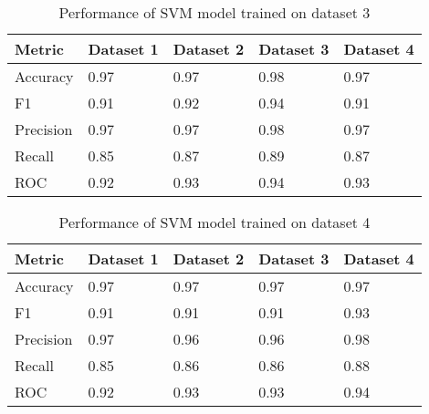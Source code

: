 \begin{table}[Ht!]
    \caption{Performance of SVM model trained on dataset 3}\label{tab:performance_of_svm_model_trained_on_dataset_3}
    \begin{tabular*}{\tblwidth}{@{}LLLLL@{}}
        \toprule
        Metric & Dataset 1 & Dataset 2 & Dataset 3 & Dataset 4 \\
        \midrule
        Accuracy & 0.97 & 0.97 & 0.98 & 0.97 \\
        F1 & 0.91 & 0.92 & 0.94 & 0.91 \\
        Precision & 0.97 & 0.97 & 0.98 & 0.97 \\
        Recall & 0.85 & 0.87 & 0.89 & 0.87 \\
        ROC & 0.92 & 0.93 & 0.94 & 0.93 \\
        \bottomrule
    \end{tabular*}
\end{table}

\begin{table}[Ht!]
    \caption{Performance of SVM model trained on dataset 4}\label{tab:performance_of_svm_model_trained_on_dataset_4}
    \begin{tabular*}{\tblwidth}{@{}LLLLL@{}}
        \toprule
        Metric & Dataset 1 & Dataset 2 & Dataset 3 & Dataset 4 \\
        \midrule
        Accuracy & 0.97 & 0.97 & 0.97 & 0.97 \\
        F1 & 0.91 & 0.91 & 0.91 & 0.93 \\
        Precision & 0.97 & 0.96 & 0.96 & 0.98 \\
        Recall & 0.85 & 0.86 & 0.86 & 0.88 \\
        ROC & 0.92 & 0.93 & 0.93 & 0.94 \\
        \bottomrule
    \end{tabular*}
\end{table}

\newpage